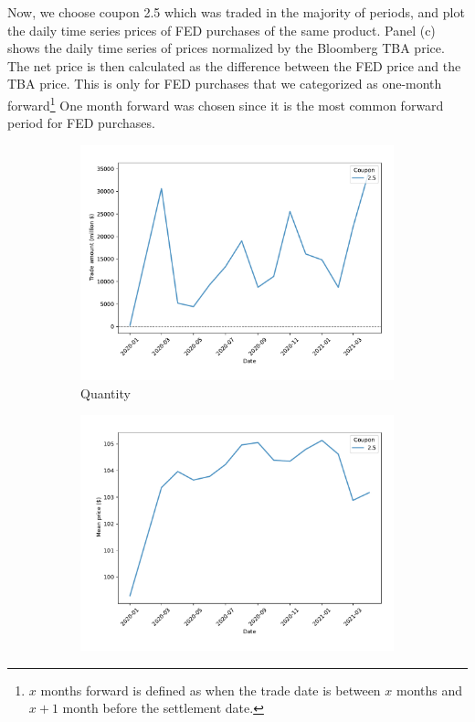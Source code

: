 \documentclass[11pt,a4paper]{article}
\begin{document}
\pagebreak

Now, we choose coupon 2.5 which was traded in the majority of periods, and plot the daily time series prices of FED purchases of the same product. Panel (c) shows the daily time series of prices normalized by the Bloomberg TBA price.  The net price is then calculated as the difference between the FED price and the TBA price. This is only for FED purchases that we categorized as one-month forward\footnote{$x$ months forward is defined as when the trade date is between $x$ months and $x+1$ month before the settlement date.} One month forward was chosen since it is the most common forward period for FED purchases. 

\begin{figure}[h]
  \centering
  \begin{subfigure}[b]{0.49\textwidth}
    \includegraphics[width=0.998\textwidth]{../results/figures/fed_trade_amount_mat30_loan1_timeseries_cpmonthly_coup2.5}
    \caption{ Quantity }
    \end{subfigure}
  \begin{subfigure}[b]{0.49\textwidth}
    \includegraphics[width=0.998\textwidth]{../results/figures/fed_price_mean_mat30_loan1_timeseries_cpmonthly_coup2.5}

\end{subfigure}
\end{figure}
\end{document}
